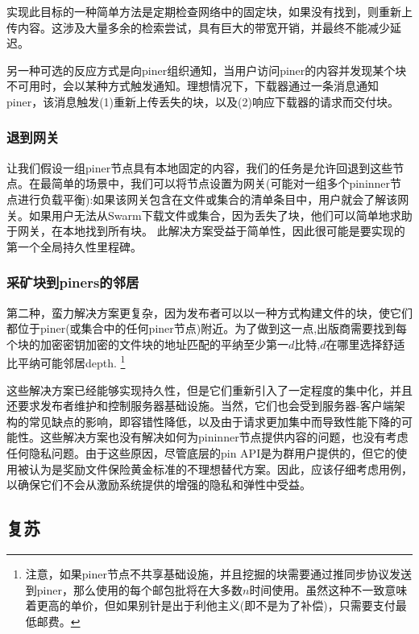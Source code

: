 实现此目标的一种简单方法是定期检查网络中的固定块，如果没有找到，则重新上传内容。这涉及大量多余的检索尝试，具有巨大的带宽开销，并最终不能减少延迟。

另一种可选的反应方式是向piner组织通知，当用户访问piner的内容并发现某个块不可用时，会以某种方式触发通知。理想情况下，下载器通过一条消息通知piner，该消息触发(1)重新上传丢失的块，以及(2)响应下载器的请求而交付块。  

\subsubsection{退到网关}

让我们假设一组piner节点具有本地固定的内容，我们的任务是允许回退到这些节点。在最简单的场景中，我们可以将节点设置为网关(可能对一组多个pininner节点进行负载平衡):如果该网关包含在文件或集合的清单条目中，用户就会了解该网关。如果用户无法从Swarm下载文件或集合，因为丢失了块，他们可以简单地求助于网关，在本地找到所有块。
此解决方案受益于简单性，因此很可能是要实现的第一个全局持久性里程碑。  

\subsubsection{采矿块到piners的邻居}

第二种，蛮力解决方案更复杂，因为发布者可以以一种方式构建文件的块，使它们都位于piner(或集合中的任何piner节点)附近。为了做到这一点,出版商需要找到每个块的加密密钥加密的文件块的地址匹配的平纳至少第一$d$比特,$d$在哪里选择舒适比平纳可能邻居depth. %
%
\footnote{注意，如果piner节点不共享基础设施，并且挖掘的块需要通过推同步协议发送到piner，那么使用的每个邮包批将在大多数$n$时间使用。虽然这种不一致意味着更高的单价，但如果别针是出于利他主义(即不是为了补偿)，只需要支付最低邮费。
}

这些解决方案已经能够实现持久性，但是它们重新引入了一定程度的集中化，并且还要求发布者维护和控制服务器基础设施。当然，它们也会受到服务器-客户端架构的常见缺点的影响，即容错性降低，以及由于请求更加集中而导致性能下降的可能性。这些解决方案也没有解决如何为pininner节点提供内容的问题，也没有考虑任何隐私问题。由于这些原因，尽管底层的pin API是为群用户提供的，但它的使用被认为是奖励文件保险黄金标准的不理想替代方案。因此，应该仔细考虑用例，以确保它们不会从激励系统提供的增强的隐私和弹性中受益。



\subsection{复苏\statusyellow}\label{sec:recovery-chunks}


